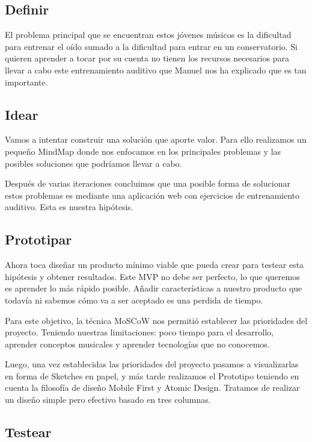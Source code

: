 \documentclass[12pt,twoside,titlepage]{report}
\begin{document}
\subsection{Definir}

El problema principal que se encuentran estos jóvenes músicos es la dificultad para entrenar el oído sumado a la dificultad para entrar en un conservatorio. Si quieren aprender a tocar por su cuenta no tienen los recursos necesarios para llevar a cabo este entrenamiento auditivo que Manuel nos ha explicado que es tan importante.

\subsection{Idear}

Vamos a intentar construir una solución que aporte valor. Para ello realizamos un pequeño MindMap donde nos enfocamos en los principales problemas y las posibles soluciones que podríamos llevar a cabo.

Después de varias iteraciones concluimos que una posible forma de solucionar estos problemas es mediante una aplicación web con ejercicios de entrenamiento auditivo. Esta es nuestra hipótesis.

\subsection{Prototipar}

Ahora toca diseñar un producto mínimo viable que pueda crear para testear esta hipótesis y obtener resultados. Este MVP no debe ser perfecto, lo que queremos es aprender lo más rápido posible. Añadir características a nuestro producto que todavía ni sabemos cómo va a ser aceptado es una perdida de tiempo. 

Para este objetivo, la técnica MoSCoW nos permitió establecer las prioridades del proyecto. Teniendo nuestras limitaciones: poco tiempo para el desarrollo, aprender conceptos musicales y aprender tecnologías que no conocemos.

Luego, una vez establecidas las prioridades del proyecto pasamos a visualizarlas en forma de Sketches en papel, y más tarde realizamos el Prototipo teniendo en cuenta la filosofía de diseño Mobile First y Atomic Design. Tratamos de realizar un diseño simple pero efectivo basado en tres columnas.

\subsection{Testear}
\end{document}
